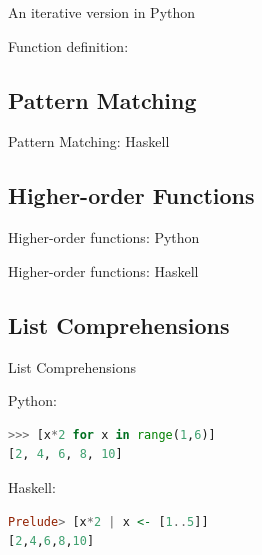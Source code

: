 \documentclass{beamer}
\begin{document}
\begin{frame}{An iterative version in Python}

Function definition:
  
\end{frame}

\subsection{Pattern Matching}

\begin{frame}{Pattern Matching: Haskell}

  

\end{frame}

\subsection{Higher-order Functions}

\begin{frame}{Higher-order functions: Python}

  

\end{frame}

\begin{frame}{Higher-order functions: Haskell}

  

\end{frame}


\subsection{List Comprehensions}

\begin{frame}[fragile]{List Comprehensions}

Python:
  \begin{lstlisting}[language=Python]
>>> [x*2 for x in range(1,6)]
[2, 4, 6, 8, 10]
  \end{lstlisting}

Haskell:
  \begin{lstlisting}[language=Haskell]
Prelude> [x*2 | x <- [1..5]]
[2,4,6,8,10]
  \end{lstlisting}

\end{frame}
\end{document}
